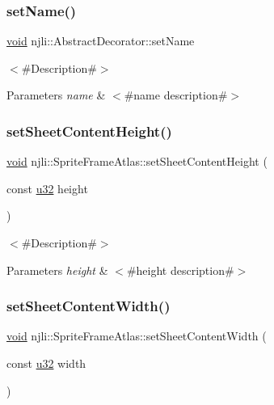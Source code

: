 \subsubsection{\texorpdfstring{set\+Name()}{setName()}}
{\footnotesize\ttfamily \mbox{\hyperlink{_thread_8h_af1e856da2e658414cb2456cb6f7ebc66}{void}} njli\+::\+Abstract\+Decorator\+::set\+Name}

$<$\#\+Description\#$>$


\begin{DoxyParams}{Parameters}
{\em name} & $<$\#name description\#$>$ \\
\hline
\end{DoxyParams}
\mbox{\label{classnjli_1_1_sprite_frame_atlas_a3ad6be6edaad4035f39bc4f2f992d424}} 
\subsubsection{\texorpdfstring{set\+Sheet\+Content\+Height()}{setSheetContentHeight()}}
{\footnotesize\ttfamily \mbox{\hyperlink{_thread_8h_af1e856da2e658414cb2456cb6f7ebc66}{void}} njli\+::\+Sprite\+Frame\+Atlas\+::set\+Sheet\+Content\+Height (\begin{DoxyParamCaption}\item[{const \mbox{\hyperlink{_util_8h_a10e94b422ef0c20dcdec20d31a1f5049}{u32}}}]{height }\end{DoxyParamCaption})}

$<$\#\+Description\#$>$


\begin{DoxyParams}{Parameters}
{\em height} & $<$\#height description\#$>$ \\
\hline
\end{DoxyParams}
\mbox{\label{classnjli_1_1_sprite_frame_atlas_a13cf0c784936ff97ddffbce245df1c9c}} 
\subsubsection{\texorpdfstring{set\+Sheet\+Content\+Width()}{setSheetContentWidth()}}
{\footnotesize\ttfamily \mbox{\hyperlink{_thread_8h_af1e856da2e658414cb2456cb6f7ebc66}{void}} njli\+::\+Sprite\+Frame\+Atlas\+::set\+Sheet\+Content\+Width (\begin{DoxyParamCaption}\item[{const \mbox{\hyperlink{_util_8h_a10e94b422ef0c20dcdec20d31a1f5049}{u32}}}]{width }\end{DoxyParamCaption})}

